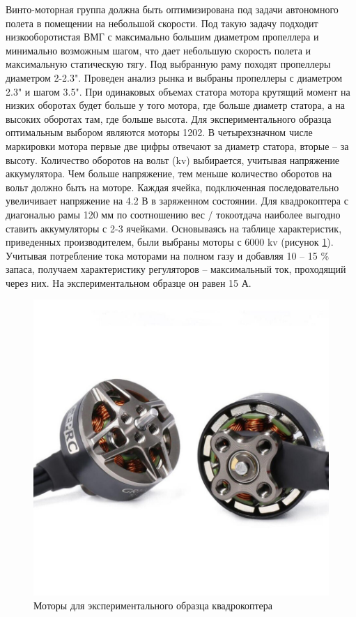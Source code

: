 
Винто-моторная группа должна быть оптимизирована под задачи автономного полета в помещении на небольшой скорости. Под такую задачу подходит низкооборотистая ВМГ с максимально большим диаметром пропеллера и минимально возможным шагом, что дает небольшую скорость полета и максимальную статическую тягу. Под выбранную раму походят пропеллеры диаметром 2-2.3". Проведен анализ рынка и выбраны пропеллеры с диаметром 2.3" и шагом 3.5". При одинаковых объемах статора мотора крутящий момент на низких оборотах будет больше у того мотора, где больше диаметр статора, а на высоких оборотах там, где больше высота. Для экспериментального образца оптимальным выбором являются моторы 1202. В четырехзначном числе маркировки мотора первые две цифры отвечают за диаметр статора, вторые -- за высоту. Количество оборотов на вольт (kv) выбирается, учитывая напряжение аккумулятора. Чем больше напряжение, тем меньше количество оборотов на вольт должно быть на моторе. Каждая ячейка, подключенная последовательно увеличивает напряжение на 4.2 В в заряженном состоянии. Для квадрокоптера с диагональю рамы 120 мм по соотношению вес / токоотдача наиболее выгодно ставить аккумуляторы с 2-3 ячейками. Основываясь на таблице характеристик, приведенных производителем, были выбраны моторы с 6000 kv (рисунок \ref{fig:motor}).
Учитывая потребление тока моторами на полном газу и добавляя 10 -- 15 \% запаса, получаем характеристику регуляторов -- максимальный ток, проходящий через них. На экспериментальном образце он равен 15 А.
\begin{figure}[H]
	\centering
	\includegraphics[width=0.5\linewidth]{../RW/pics/motor}
	\caption{Моторы для экспериментального образца квадрокоптера
	}
	\label{fig:motor} %
\end{figure}

